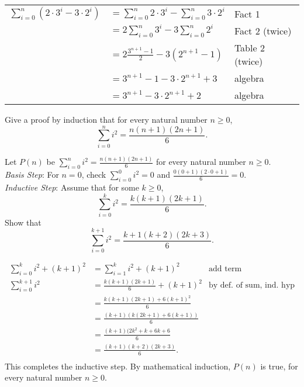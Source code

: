 \documentclass[11pt]{exam}
\begin{document}
\begin{questions}
\begin{solution}
\begin{tabular}{rll}
  $\displaystyle \sum_{i=0}^n (2 \cdot 3^i - 3 \cdot 2^i)$ & $\displaystyle =  \sum_{i=0}^n 2 \cdot 3^i - \sum_{i=0}^n 3 \cdot 2^i$ & Fact 1 \\
   & $\displaystyle = 2 \sum_{i=0}^n 3^i - 3 \sum_{i=0}^n 2^i$ & Fact 2 (twice) \\
   & $\displaystyle = 2 \frac{3^{n+1} -1}{2} - 3(2^{n+1} - 1) $ & Table 2 (twice) \\
   & $\displaystyle = 3^{n+1} - 1 - 3 \cdot 2^{n+1} + 3 $ &  algebra \\
   & $\displaystyle = 3^{n+1} - 3 \cdot 2^{n+1} + 2 $ & algebra \\
\end{tabular}
\end{solution}


\question Give a proof by induction that for every natural
number $n \geq 0$,
\[ \sum_{i=0}^n i^2 = \frac{n(n+1)(2n+1)}{6}.\]

\begin{solution}
 Let $P(n)$ be $\displaystyle \sum_{i=0}^n i^2 = \frac{n(n+1)(2n+1)}{6}$ for every natural number $n\geq 0$. \\

    \textit{Basis Step}: For $n=0$, check $ \displaystyle \sum_{i=0}^0 i^2 = 0$ and $\frac{0(0+1)(2\cdot 0 +1)}{6} = 0$. \\
    \textit{Inductive Step}: Assume that for some $k \geq 0$,
    \[ \sum_{i=0}^k i^2 = \frac{k(k+1)(2k+1)}{6}. \]
    Show that
    \[ \sum_{i=0}^{k+1} i^2 = \frac{k+1(k+2)(2k+3)}{6}. \]

    \begin{align*}
        \sum_{i=0}^{k} i^2 + (k+1)^2 &= \sum_{i=1}^k i^2 + (k+1)^2   & \text{add term} \\
        \sum_{i=0}^{k+1} i^2 &= \frac{k(k+1)(2k+1)}{6} + (k+1)^2               & \text{by def. of sum, ind. hyp} \\
          &= \frac{k(k+1)(2k+1) +6(k+1)^2}{6}  \\
          &= \frac{(k+1)(k(2k+1) +6(k+1))}{6} \\
          &= \frac{(k+1)(2k^2 + k + 6k + 6}{6} \\
          &= \frac{(k+1)(k+2)(2k +3)}{6}. \\
    \end{align*}
    This completes the inductive step. By mathematical induction, $P(n)$ is true, for every natural number $n \geq 0$.
\end{solution}



\end{questions}
\end{document}

